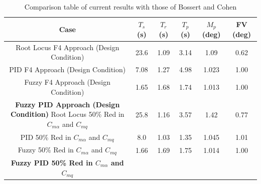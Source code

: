 \begin{table}[h] \centering \caption{Comparison table of current results with those of Bossert and
    Cohen}\label{t:f4} \begin{tabular}{|c|c|c|c|c|c|}\hline Case & $T_s$ (s) & $T_r$ (s) & $T_p$ (s) & $M_p$
        (deg) & FV (deg) \\\hline Root Locus F4 Approach (Design Condition) & 23.6 & 1.09 & 3.14 & 1.09 & 0.62
        \\\hline PID F4 Approach (Design Condition) & 7.08 & 1.27 & 4.98 & 1.023 & 1.00 \\\hline Fuzzy F4
        Approach (Design Condition) & 1.65 & 1.68 & 1.74 & 1.013 & 1.00 \\\hline \textbf{Fuzzy PID Approach
        (Design Condition)}  Root Locus 50\% Red in $C_{m\alpha}$ and $C_{mq}$ & 25.8
                                                                                                       & 1.16
                                                                                                       & 3.57
                                                                                                       & 1.42
                                                                                                       & 0.77
        \\\hline PID 50\% Red in $C_{m\alpha}$ and $C_{mq}$ & 8.0 & 1.03 & 1.35 & 1.045 & 1.01 \\\hline Fuzzy
    50\% Red in $C_{m\alpha}$ and $C_{mq}$ & 1.66 & 1.69 & 1.75 & 1.014 & 1.00 \\\hline \textbf{Fuzzy PID 50\%
Red in $C_{m\alpha}$ and $C_{mq}$}  \end{tabular} \end{table}

